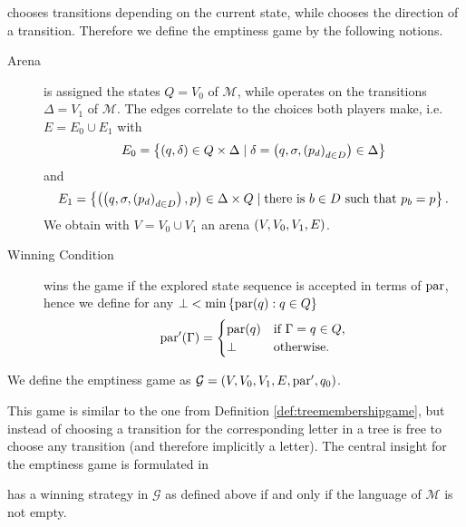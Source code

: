 \begin{definition}
  \eve{} chooses transitions depending on the current state, while
  \adam{} chooses the direction of a transition. Therefore
  we define the emptiness game by the following notions.
  \begin{description}
    \item [Arena] \eve{} is assigned the states $Q = V_{0}$ of 
      $\mathcal{M}$, while \adam{} operates on the transitions 
      $\Delta = V_{1}$ of $\mathcal{M}$. The edges correlate to the choices
      both players make, i.e. $E = E_{0}\cup E_{1}$ with
      \begin{equation*}
        E_{0} = \left\{\left(q, \delta\right)\in Q\times\Delta\mid\delta = 
          \left(q, \sigma, \left(p_{d}\right)_{d\in D}\right)\in\Delta\right\}
      \end{equation*}
      and
      \begin{equation*}
        E_{1} = \left\{\left(\left(q, \sigma, \left(p_{d}\right)_{d\in D}\right), p\right)
          \in\Delta\times Q\mid\text{there is }b\in D
          \text{ such that }p_{b} = p
        \right\}.
      \end{equation*}
      We obtain with $V = V_{0}\cup V_{1}$ an arena 
      $\left(V, V_{0}, V_{1}, E\right)$.
    \item [Winning Condition] \eve{} wins the game if the explored state 
      sequence is accepted in terms of $\operatorname{par}$, hence we define for any
      $\bot < \min\left\{\operatorname{par}(q):q\in Q\right\}$
      \begin{equation*}
        \operatorname{par}'(\Gamma) = \begin{cases}
          \operatorname{par}(q) &\text{if }\Gamma = q\in Q,\\
          \bot       &\text{otherwise}.
        \end{cases}
      \end{equation*}
  \end{description}
  We define the emptiness game as 
  $\mathcal{G} = \left(V, V_{0}, V_{1}, E, \operatorname{par}', q_{0}\right)$.
  \label{def:treeemptinessgame}
\end{definition}
This game is similar to the one from Definition \ref{def:treemembershipgame}, 
but instead of choosing a transition for the corresponding letter in a tree 
\eve{} is free to choose any transition (and therefore implicitly a letter).
The central insight for the emptiness game is formulated in
\begin{lemma}
  \eve{} has a winning strategy in $\mathcal{G}$ as defined above
  if and only if the language of $\mathcal{M}$ is not empty.
  \label{lem:evewinningemptiness}
\end{lemma}
